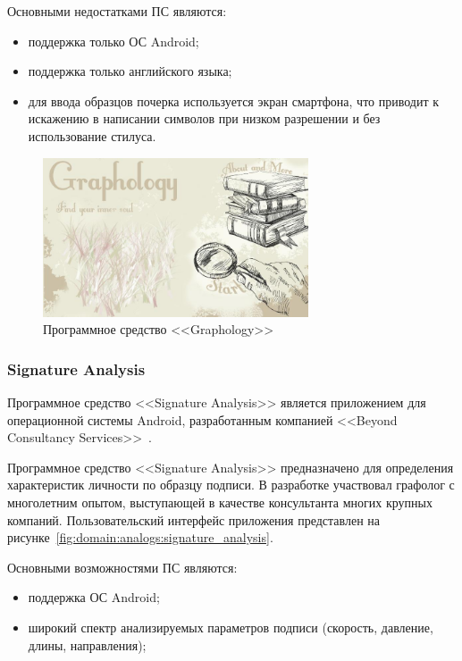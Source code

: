 Основными недостатками ПС являются:
\begin{itemize}
  \item поддержка только ОС Android;
  \item поддержка только английского языка;
  \item для ввода образцов почерка используется экран смартфона, что приводит к искажению в написании символов при низком разрешении и без использование стилуса.
\end{itemize}

\begin{figure}[ht]
    \centering
    \includegraphics[width=0.7\textwidth]{figures/graphology_analog.jpeg}
    \caption{Программное средство <<Graphology>>}
    \label{fig:domain:analogs:graphology}
\end{figure}

\subsubsection{Signature Analysis}
\label{sub:domain:analogs:signature_analysis} 

Программное средство <<Signature Analysis>> является приложением для операционной системы Android, разработанным компанией <<Beyond Consultancy Services>>~\cite{analogs_signature_analysis}.

Программное средство <<Signature Analysis>> предназначено для определения характеристик личности по образцу подписи. В разработке участвовал графолог с многолетним опытом, выступающей в качестве консультанта многих крупных компаний.  Пользовательский интерфейс приложения представлен на рисунке~\ref{fig:domain:analogs:signature_analysis}.

Основными возможностями ПС являются:
\begin{itemize}
  \item поддержка ОС Android;
  \item широкий спектр анализируемых параметров подписи (скорость, давление, длины, направления);
\end{itemize}

